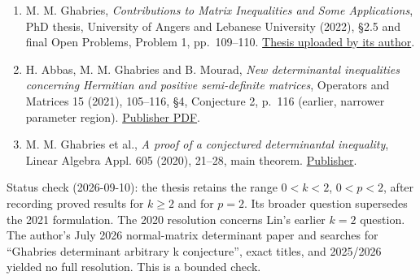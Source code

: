 \documentclass[11pt,a4paper]{article}
\providecommand{\tightlist}{\setlength{\itemsep}{0pt}\setlength{\parskip}{0pt}}
\begin{document}
\begin{enumerate}
\def\labelenumi{\arabic{enumi}.}
\tightlist
\item
  M. M. Ghabries, \emph{Contributions to Matrix Inequalities and Some
  Applications}, PhD thesis, University of Angers and Lebanese
  University (2022), §2.5 and final Open Problems, Problem 1,
  pp.~109--110.
  \href{https://www.researchgate.net/publication/361793582_Contributions_to_Matrix_Inequalities_and_Some_Applications}{Thesis
  uploaded by its author}.
\item
  H. Abbas, M. M. Ghabries and B. Mourad, \emph{New determinantal
  inequalities concerning Hermitian and positive semi-definite
  matrices}, Operators and Matrices 15 (2021), 105--116, §4, Conjecture
  2, p.~116 (earlier, narrower parameter region).
  \href{https://files.ele-math.com/articles/oam-15-07.pdf}{Publisher
  PDF}.
\item
  M. M. Ghabries et al., \emph{A proof of a conjectured determinantal
  inequality}, Linear Algebra Appl. 605 (2020), 21--28, main theorem.
  \href{https://doi.org/10.1016/j.laa.2020.07.013}{Publisher}.
\end{enumerate}

Status check (2026-09-10): the thesis retains the range \(0< k<2\),
\(0< p<2\), after recording proved results for \(k\ge2\) and for
\(p=2\). Its broader question supersedes the 2021 formulation. The 2020
resolution concerns Lin's earlier \(k=2\) question. The author's July
2026 normal-matrix determinant paper and searches for ``Ghabries
determinant arbitrary k conjecture'', exact titles, and 2025/2026
yielded no full resolution. This is a bounded check.
\end{document}
